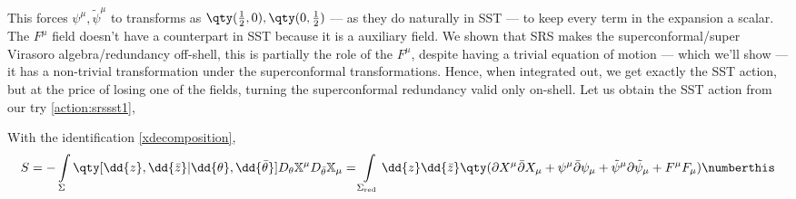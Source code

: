 This forces $\psi^\mu,{\tilde\psi}^\mu$ to transforms as $\qty(\frac12,0),\qty(0,\frac12)$ --- as they do naturally in SST --- to keep every term in the expansion a scalar. 
The $F^\mu$ field doesn't have a counterpart in SST because it is a auxiliary field. We shown that SRS makes the superconformal/super Virasoro 
algebra/redundancy off-shell, this is partially the role of the $F^\mu$, despite having a trivial equation of motion --- which we'll show --- 
it has a non-trivial transformation under the superconformal transformations. Hence, when integrated out, we get exactly the SST action, but at 
the price of losing one of the fields, turning the superconformal redundancy valid only on-shell. Let us obtain the SST action from our 
try \eqref{action:srssst1},
\begin{lemma}
    With the identification \eqref{xdecomposition},
    \[S=-\int\limits_\Sigma\qty[\dd{z},\dd{\bar z}|\dd{\theta},\dd{\bar\theta}]D_\theta \mathbb X^\mu D_{\bar\theta}\mathbb X_\mu=\int\limits_{\Sigma_{\textnormal{red}}}\dd{z}\dd{\bar z}\qty(\partial X^\mu\bar\partial X_\mu+\psi^\mu\bar\partial\psi_\mu+{\tilde\psi}^\mu\partial{\tilde\psi}_\mu+F^\mu F_\mu)\numberthis\label{action:sst3}\]
\end{lemma}

